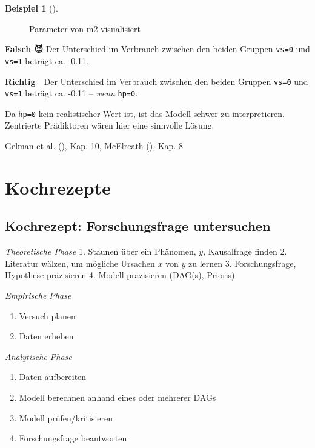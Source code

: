 \documentclass[
  ngerman,
  letterpaper,
  twoside,
  open=any]{scrbook}
\providecommand{\tightlist}{%
  \setlength{\itemsep}{0pt}\setlength{\parskip}{0pt}}\usepackage{longtable,booktabs,array}
\theoremstyle{definition}
\newtheorem{example}{Beispiel}[chapter]
\theoremstyle{plain}
\theoremstyle{definition}
\theoremstyle{definition}
\theoremstyle{remark}
\begin{document}
\begin{example}[]
\begin{figure}[H]
\caption{\label{fig-m2-params}Parameter von m2 visualisiert}

\end{figure}%

\textbf{Falsch 😈} Der Unterschied im Verbrauch zwischen den beiden
Gruppen \texttt{vs=0} und \texttt{vs=1} beträgt ca. -0.11.

\textbf{Richtig 👼} Der Unterschied im Verbrauch zwischen den beiden
Gruppen \texttt{vs=0} und \texttt{vs=1} beträgt ca. -0.11 -- \emph{wenn}
\texttt{hp=0}.

Da \texttt{hp=0} kein realistischer Wert ist, ist das Modell schwer zu
interpretieren. Zentrierte Prädiktoren wären hier eine sinnvolle Lösung.

Gelman et al. (), Kap. 10, McElreath
(), Kap. 8

\section{Kochrezepte}\label{kochrezepte}

\subsection{Kochrezept: Forschungsfrage
untersuchen}\label{kochrezept-forschungsfrage-untersuchen}

\emph{Theoretische Phase} 1. Staunen über ein Phänomen, \(y\),
Kausalfrage finden 2. Literatur wälzen, um mögliche Ursachen \(x\) von
\(y\) zu lernen 3. Forschungsfrage, Hypothese präzisieren 4. Modell
präzisieren (DAG(s), Prioris)

\emph{Empirische Phase}

\begin{enumerate}
\def\labelenumi{\arabic{enumi}.}
\setcounter{enumi}{4}
\tightlist
\item
  Versuch planen
\item
  Daten erheben
\end{enumerate}

\emph{Analytische Phase}

\begin{enumerate}
\def\labelenumi{\arabic{enumi}.}
\setcounter{enumi}{6}
\tightlist
\item
  Daten aufbereiten
\item
  Modell berechnen anhand eines oder mehrerer DAGs
\item
  Modell prüfen/kritisieren
\item
  Forschungsfrage beantworten
\end{enumerate}


\end{example}
\end{document}
